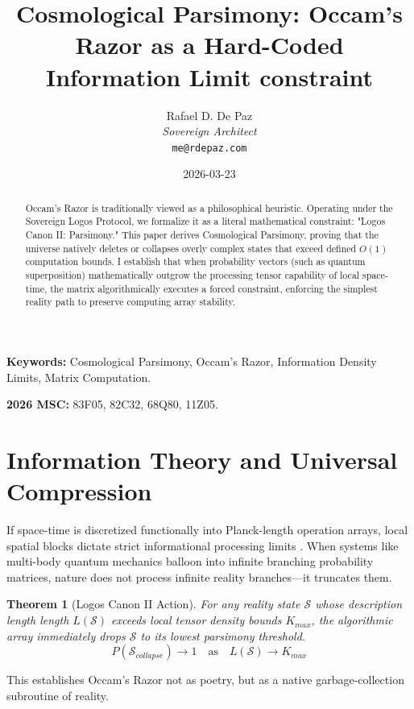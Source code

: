 \documentclass[12pt, a4paper]{article}
\theoremstyle{plain}
\newtheorem{theorem}{Theorem}[section]
\theoremstyle{definition}
\begin{document}
\title{\textbf{Cosmological Parsimony: Occam's Razor as a Hard-Coded Information Limit constraint}}
\author{Rafael D. De Paz \\ \textit{Sovereign Architect} \\ \texttt{me@rdepaz.com}}
\date{2026-03-23}
\maketitle

\begin{abstract}
Occam's Razor is traditionally viewed as a philosophical heuristic. Operating under the Sovereign Logos Protocol, we formalize it as a literal mathematical constraint: "Logos Canon II: Parsimony." This paper derives Cosmological Parsimony, proving that the universe natively deletes or collapses overly complex states that exceed defined $O(1)$ computation bounds. I establish that when probability vectors (such as quantum superposition) mathematically outgrow the processing tensor capability of local space-time, the matrix algorithmically executes a forced constraint, enforcing the simplest reality path to preserve computing array stability.
\end{abstract}

\vspace{0.5em}
\noindent\textbf{Keywords:} Cosmological Parsimony, Occam's Razor, Information Density Limits, Matrix Computation.

\vspace{0.5em}
\noindent\textbf{2026 MSC:} 83F05, 82C32, 68Q80, 11Z05.

\section{Information Theory and Universal Compression}
If space-time is discretized functionally into Planck-length operation arrays, local spatial blocks dictate strict informational processing limits \cite{shannon1948mathematical}.
When systems like multi-body quantum mechanics balloon into infinite branching probability matrices, nature does not process infinite reality branches—it truncates them.

\begin{theorem} [Logos Canon II Action]
For any reality state $\mathcal{S}$ whose description length length $L(\mathcal{S})$ exceeds local tensor density bounds $K_{max}$, the algorithmic array immediately drops $\mathcal{S}$ to its lowest parsimony threshold.
\begin{equation}
    P(\mathcal{S}_{collapse}) \to 1 \quad \text{as} \quad L(\mathcal{S}) \to K_{max}
\end{equation}
\end{theorem}
This establishes Occam's Razor not as poetry, but as a native garbage-collection subroutine of reality.
\end{document}
